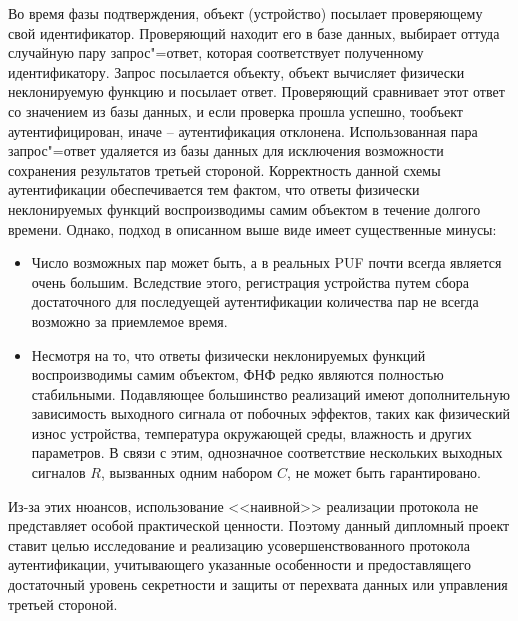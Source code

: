 Во время фазы подтверждения, объект (устройство) посылает проверяющему свой идентификатор. Проверяющий находит его в базе данных, выбирает оттуда случайную пару запрос"=ответ, которая соответствует полученному идентификатору. Запрос посылается объекту, объект вычисляет физически неклонируемую функцию и посылает ответ. Проверяющий сравнивает этот ответ со значением из базы данных, и если проверка прошла успешно, тообъект аутентифицирован, иначе -- аутентификация отклонена. Использованная пара запрос"=ответ удаляется из базы данных для исключения возможности сохранения результатов третьей стороной. Корректность данной схемы аутентификации обеспечивается тем фактом, что ответы физически неклонируемых функций воспроизводимы самим объектом в течение долгого времени.
Однако, подход в описанном выше виде имеет существенные минусы:
\begin{itemize}
  \item Число возможных пар может быть, а в реальных PUF почти всегда является очень большим. Вследствие этого, регистрация устройства путем сбора достаточного для последуещей аутентификации количества пар не всегда возможно за приемлемое время.
  \item Несмотря на то, что ответы физически неклонируемых функций воспроизводимы самим объектом, ФНФ редко являются полностью стабильными. Подавляющее большинство реализаций имеют дополнительную зависимость выходного сигнала от побочных эффектов, таких как физический износ устройства, температура окружающей среды, влажность и других параметров. В связи с этим, однозначное соответствие нескольких выходных сигналов $ R $, вызванных одним набором $ C $, не может быть гарантировано.
\end{itemize}

Из-за этих нюансов, использование <<наивной>> реализации протокола не представляет особой практической ценности. Поэтому данный дипломный проект ставит целью исследование и реализацию усовершенствованного протокола аутентификации, учитывающего указанные особенности и предоставлящего достаточный уровень секретности и защиты от перехвата данных или управления третьей стороной.


